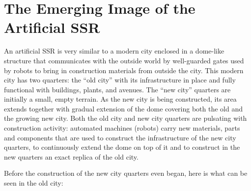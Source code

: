 
\section{The Emerging Image of the Artificial SSR}

An artificial SSR is very similar to a modern city enclosed in a
dome-like structure that communicates with the outside world by
well-guarded gates used by robots to bring in construction materials
from outside the city. This modern city has two quarters: the “old
city” with its infrastructure in place and fully functional with
buildings, plants, and avenues. The “new city” quarters are initially a
small, empty terrain. As the new city is being constructed, its area
extends together with gradual extension of the dome covering both the
old and the growing new city. Both the old city and new city quarters
are pulsating with construction activity: automated machines (robots)
carry new materials, parts and components that are used to construct
the infrastructure of the new city quarters, to continuously extend the
dome on top of it and to construct in the new quarters an exact replica
of the old city.

Before the construction of the new city quarters even began, here is
what can be seen in the old city:

